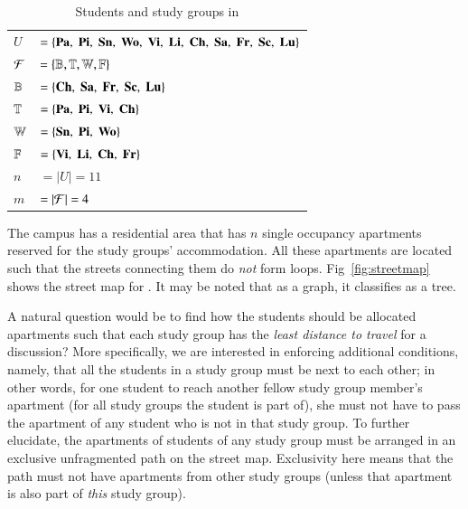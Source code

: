 \documentclass[MS,]{iitmdiss}
\begin{document}

\begin{table}[htbp]
  \centering
  \begin{tabular}{ll}
    $U $&$= \{{\bf Pa},\; {\bf Pi},\; {\bf Sn},\; {\bf Wo},\; {\bf Vi},\; {\bf Li},\; {\bf Ch},\;
    {\bf Sa},\; {\bf Fr},\; {\bf Sc},\; {\bf Lu}\}$\\
    ${\cal F} $&$= \{\mathbb{B}, \mathbb{T}, \mathbb{W}, \mathbb{F}\}$\\
    $\mathbb{B} $&$= \{{\bf Ch},\;  {\bf Sa},\;  {\bf Fr},\;  {\bf Sc},\;  {\bf Lu} \}$\\
    $\mathbb{T} $&$= \{{\bf Pa},\;  {\bf Pi},\;  {\bf Vi},\;  {\bf Ch} \}$\\
    $\mathbb{W} $&$= \{{\bf Sn},\;  {\bf Pi},\;  {\bf Wo} \}$\\
    $\mathbb{F} $&$= \{{\bf Vi},\;  {\bf Li},\;  {\bf Ch},\;  {\bf Fr} \}$\\
    $n $&$= |U| = 11$\\
    $m $&$= |{\cal F}| = 4$      
  \end{tabular}
  \caption{Students and study groups in \WSI}
  \label{tab:wsigroups}
\end{table}


The campus has a residential area {\residenceblock} that has $n$
single occupancy apartments reserved for the study groups'
accommodation.  All these apartments are located such that the streets
connecting them do {\em not} form loops. Fig~\ref{fig:streetmap} shows
the street map for {\residenceblock}. It may be noted that as a graph, it
classifies as a tree.


A natural question would be to find how the students should be
allocated apartments such that each study group has the {\em least
  distance to travel} for a discussion? More specifically, we are
interested in enforcing additional conditions, namely, that all the
students in a study group must be next to each other; in other words,
for one student to reach another fellow study group member's apartment
(for all study groups the student is part of), she must not have to
pass the apartment of any student who is not in that study group. To
further elucidate, the apartments of students of any study group must
be arranged in an exclusive unfragmented path on the street
map. Exclusivity here means that the path must not have apartments
from other study groups (unless that apartment is also part of {\em
  this} study group).
\end{document}
